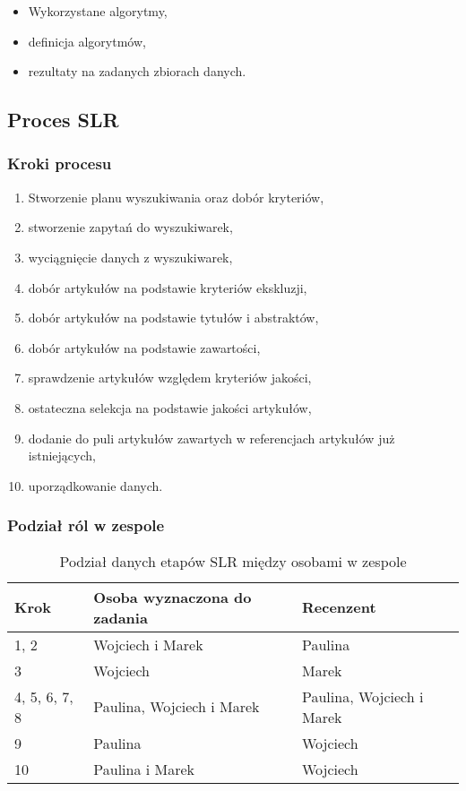 \documentclass[polish,envcountsect,10pt]{article}
\begin{document}
\begin{itemize}
	\item Wykorzystane algorytmy,
	\item definicja algorytmów,
	\item rezultaty na zadanych zbiorach danych.
\end{itemize}

\subsection{Proces SLR}

\subsubsection{Kroki procesu}

\begin{enumerate}
	\item Stworzenie planu wyszukiwania oraz dobór kryteriów,
	\item stworzenie zapytań do wyszukiwarek,
	\item wyciągnięcie danych z wyszukiwarek,
	\item dobór artykułów na podstawie kryteriów ekskluzji,
	\item dobór artykułów na podstawie tytułów i abstraktów,
	\item dobór artykułów na podstawie zawartości,
	\item sprawdzenie artykułów względem kryteriów jakości,
	\item ostateczna selekcja na podstawie jakości artykułów,
	\item dodanie do puli artykułów zawartych w referencjach artykułów już istniejących,
	\item uporządkowanie danych.
\end{enumerate}

\subsubsection{Podział ról w zespole}

\begin{table}[H]
    \caption{Podział danych etapów SLR między osobami w zespole}
    \centering
    \begin{tabular}{|p{1.7cm}|p{5cm}|p{5cm}|}
        \hline
        Krok & Osoba wyznaczona do zadania & Recenzent\\
        \hline
        1, 2 & Wojciech i Marek & Paulina\\
        \hline
        3 & Wojciech & Marek\\
        \hline
        4, 5, 6, 7, 8 & Paulina, Wojciech i Marek & Paulina, Wojciech i Marek\\
        \hline
        9 & Paulina & Wojciech\\
        \hline
        10 & Paulina i Marek & Wojciech\\
        \hline
    \end{tabular}
\end{table}
\end{document}

